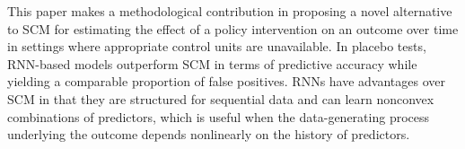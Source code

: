 \documentclass[12pt]{article}
\begin{document}
This paper makes a methodological contribution in proposing a novel alternative to SCM for estimating the effect of a policy intervention on an outcome over time in settings where appropriate control units are unavailable. In placebo tests, RNN-based models outperform SCM in terms of predictive accuracy while yielding a comparable proportion of false positives. RNNs have advantages over SCM in that they are structured for sequential data and can learn nonconvex combinations of predictors, which is useful when the data-generating process underlying the outcome depends nonlinearly on the history of predictors.%

\newpage


\begin{singlespace}

\end{singlespace}


\itemize
\end{document}
